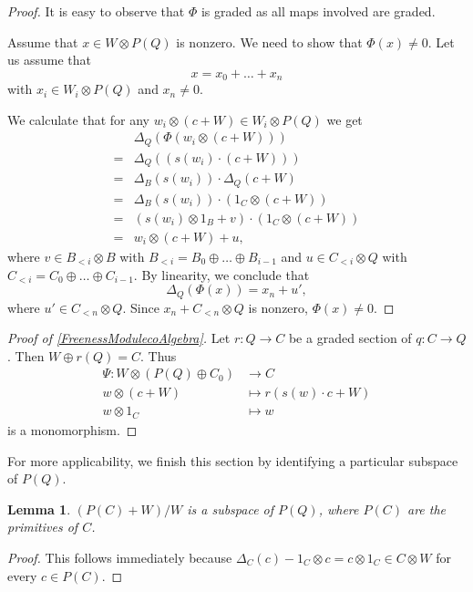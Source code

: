 \documentclass[11pt,letterpaper]{amsart}
\numberwithin{theoremcounter}{section}
\newtheorem{lemma}[lemmaauto]{Lemma}
\theoremstyle{definition}
\theoremstyle{remark}
\begin{document}
\begin{proof}
    It is easy to observe that $\Phi$ is graded as all maps involved are graded.

    Assume that $x\in W \otimes P(Q)$ is nonzero. We need to show that $\Phi(x) \neq 0$.
    Let us assume that 
    \[ x = x_0 + \dots +x_n \]
    with $x_i \in W_i \otimes P(Q)$ and $x_n \neq 0$. 


    We calculate that for any $w_i \otimes (c+W) \in W_i \otimes P(Q)$ we get
    \begin{align*}
        &\Delta_Q(\Phi(w_i \otimes (c+W)))\\
        =&\Delta_Q((s(w_i) \cdot (c+W))) \\
        =& \Delta_B(s(w_i))\cdot \Delta_Q(c+W) \\
        =& \Delta_B(s(w_i))\cdot (1_C \otimes (c+W)) \\
        =& ( s(w_i) \otimes 1_B + v) \cdot (1_C \otimes (c+W)) \\
        =& w_i \otimes (c+W) + u, 
    \end{align*}
    where $v \in B_{<i} \otimes B$ with $B_{<i} = B_0 \oplus \dots \oplus B_{i-1}$ and $u \in C_{<i}\otimes Q$ with $C_{<i} = C_0 \oplus \dots \oplus C_{i-1}$. By linearity, we conclude that
    \[\Delta_Q(\Phi(x)) = x_n + u',\]
    where $u'\in C_{<n}\otimes Q$.   Since $x_n+ C_{<n} \otimes Q$ is nonzero, $\Phi(x) \neq 0$.
\end{proof}

\begin{proof}[Proof of \autoref{FreenessModulecoAlgebra}]
    Let $r\colon Q \to C$ be a graded section of $q\colon C \to Q$. Then $W \oplus r(Q)=C$. Thus
    \begin{align*}
        \Psi\colon W \otimes (P(Q) \oplus C_0) & \longrightarrow C\\
        w \otimes (c+W) &\longmapsto r(s(w)\cdot c + W)\\
        w \otimes 1_C &\longmapsto w
    \end{align*}
    is a monomorphism.
\end{proof}

For more applicability, we finish this section by identifying a particular subspace of $P(Q)$.

\begin{lemma}
    $(P(C)+W)/ W$ is a subspace of $P(Q)$, where $P(C)$ are the primitives of $C$.
\end{lemma}

\begin{proof}
    This follows immediately because $\Delta_C(c) - 1_C \otimes c = c \otimes 1_C \in C \otimes W$ for every $c\in P(C)$.
\end{proof}
\end{document}
